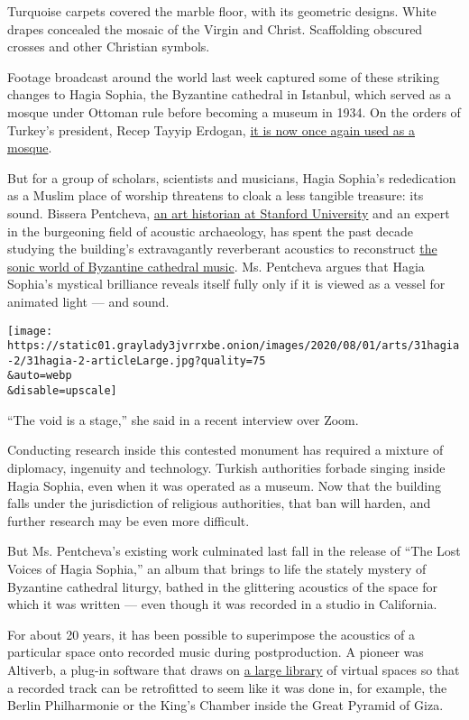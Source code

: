 Turquoise carpets covered the marble floor, with its geometric designs.
White drapes concealed the mosaic of the Virgin and Christ. Scaffolding
obscured crosses and other Christian symbols.

Footage broadcast around the world last week captured some of these
striking changes to Hagia Sophia, the Byzantine cathedral in Istanbul,
which served as a mosque under Ottoman rule before becoming a museum in
1934. On the orders of Turkey's president, Recep Tayyip Erdogan,
\href{https://www.nytimes3xbfgragh.onion/2020/07/24/world/europe/turkey-hagia-sophia-mosque-prayers.html}{it
is now once again used as a mosque}.

But for a group of scholars, scientists and musicians, Hagia Sophia's
rededication as a Muslim place of worship threatens to cloak a less
tangible treasure: its sound. Bissera Pentcheva,
\href{https://art.stanford.edu/people/bissera-pentcheva}{an art
historian at Stanford University} and an expert in the burgeoning field
of acoustic archaeology, has spent the past decade studying the
building's extravagantly reverberant acoustics to reconstruct
\href{https://ccrma.stanford.edu/groups/iconsofsound/film/}{the sonic
world of Byzantine cathedral music}. Ms. Pentcheva argues that Hagia
Sophia's mystical brilliance reveals itself fully only if it is viewed
as a vessel for animated light --- and sound.

\texttt{[image: https://static01.graylady3jvrrxbe.onion/images/2020/08/01/arts/31hagia-2/31hagia-2-articleLarge.jpg?quality=75\\\&auto=webp\\\&disable=upscale]}

``The void is a stage,'' she said in a recent interview over Zoom.

Conducting research inside this contested monument has required a
mixture of diplomacy, ingenuity and technology. Turkish authorities
forbade singing inside Hagia Sophia, even when it was operated as a
museum. Now that the building falls under the jurisdiction of religious
authorities, that ban will harden, and further research may be even more
difficult.

But Ms. Pentcheva's existing work culminated last fall in the release of
``The Lost Voices of Hagia Sophia,'' an album that brings to life the
stately mystery of Byzantine cathedral liturgy, bathed in the glittering
acoustics of the space for which it was written --- even though it was
recorded in a studio in California.

For about 20 years, it has been possible to superimpose the acoustics of
a particular space onto recorded music during postproduction. A pioneer
was Altiverb, a plug-in software that draws on
\href{https://www.audioease.com/altiverb/browse.php}{a large library} of
virtual spaces so that a recorded track can be retrofitted to seem like
it was done in, for example, the Berlin Philharmonie or the King's
Chamber inside the Great Pyramid of Giza.

